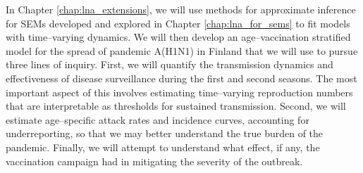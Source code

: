 In Chapter \ref{chap:lna_extensions}, we will use methods for approximate inference for SEMs developed and explored in Chapter \ref{chap:lna_for_sems} to fit models with time--varying dynamics. We will then develop an age--vaccination stratified model for the spread of pandemic A(H1N1) in Finland that we will use to pursue three lines of inquiry. First, we will quantify the transmission dynamics and effectiveness of disease surveillance during the first and second seasons. The most important aspect of this involves estimating time--varying reproduction numbers that are interpretable as thresholds for sustained transmission. Second, we will estimate age--specific attack rates and  incidence curves, accounting for underreporting, so that we may better understand the true burden of the pandemic. Finally, we will attempt to understand what effect, if any, the vaccination campaign had in mitigating the severity of the outbreak.
